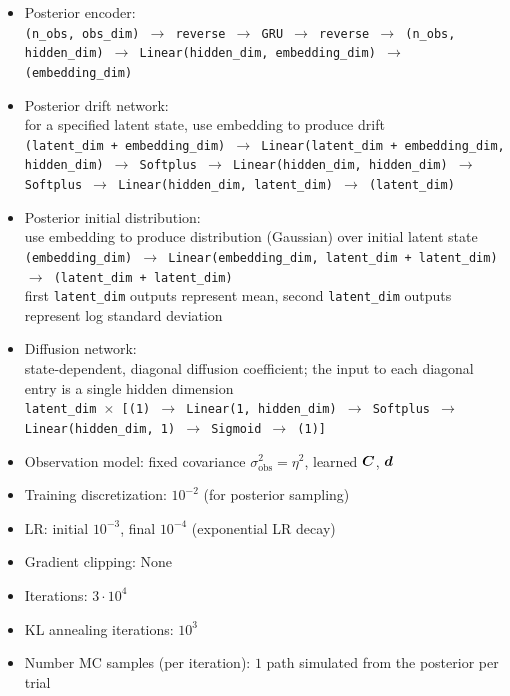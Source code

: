 \begin{itemize}
\begin{itemize}
        \item Posterior encoder:\\ \texttt{(n\_obs, obs\_dim) $\to$ reverse $\to$ GRU $\to$ reverse $\to$ (n\_obs, hidden\_dim) $\to$ Linear(hidden\_dim, embedding\_dim) $\to$ (embedding\_dim)}
        \item Posterior drift network:\\ 
        for a specified latent state, use embedding to produce drift\\
        \texttt{(latent\_dim + embedding\_dim) $\to$ Linear(latent\_dim + embedding\_dim, hidden\_dim) $\to$ Softplus $\to$ Linear(hidden\_dim, hidden\_dim) $\to$ Softplus $\to$ Linear(hidden\_dim, latent\_dim) $\to$ (latent\_dim)}
        \item Posterior initial distribution:\\
        use embedding to produce distribution (Gaussian) over initial latent state\\
        \texttt{(embedding\_dim) $\to$ Linear(embedding\_dim, latent\_dim + latent\_dim) $\to$ (latent\_dim + latent\_dim)}\\
        first \texttt{latent\_dim} outputs represent mean, second \texttt{latent\_dim} outputs represent log standard deviation
        \item Diffusion network:\\ 
        state-dependent, diagonal diffusion coefficient; the input to each diagonal entry is a single hidden dimension\\
        \texttt{latent\_dim $\times$ [(1) $\to$ Linear(1, hidden\_dim) $\to$ Softplus $\to$ Linear(hidden\_dim, 1) $\to$ Sigmoid $\to$ (1)]}
        \item Observation model: fixed covariance $\sigma_{\mathrm{obs}}^2 = \eta^2$, learned $\boldsymbol{C}$, $\boldsymbol{d}$
        \item Training discretization: $10^{-2}$ (for posterior sampling)
        \item LR: initial $10^{-3}$, final $10^{-4}$ (exponential LR decay)
        \item Gradient clipping: None
        \item Iterations: $3 \cdot 10^4$
        \item KL annealing iterations: $10^3$ 
        \item Number MC samples (per iteration): $1$ path simulated from the posterior per trial

    \end{itemize}
\end{itemize}


